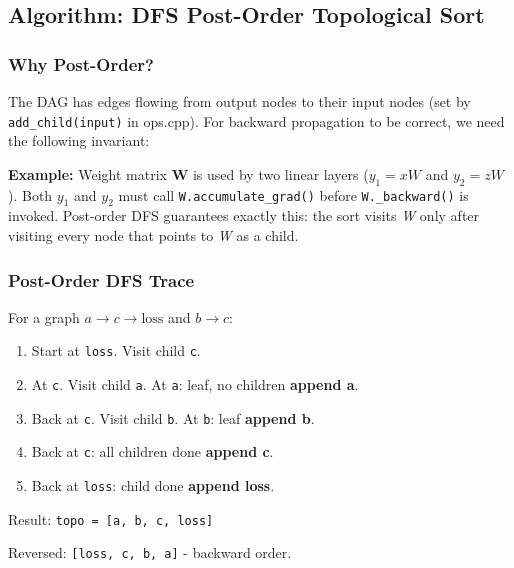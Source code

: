 \documentclass[12pt, a4paper]{article}
\begin{document}
\subsection{Algorithm: DFS Post-Order Topological Sort}

\subsubsection{Why Post-Order?}

The DAG has edges flowing from output nodes to their input nodes (set by
\texttt{add\_child(input)} in ops.cpp).  For backward propagation to be
correct, we need the following invariant:

\begin{tcolorbox}[interviewbox,
    title={Invariant: A node's gradient must be \emph{fully accumulated}
           before its \texttt{\_backward()} fires.}]
  \textbf{Example:}  Weight matrix \textbf{W} is used by two linear layers
  (\(y_1 = xW\) and \(y_2 = zW\)).  Both \(y_1\) and \(y_2\) must call
  \texttt{W.accumulate\_grad()} before \texttt{W.\_backward()} is invoked.
  Post-order DFS guarantees exactly this: the sort visits \textit{W} only
  after visiting every node that points to \textit{W} as a child.
\end{tcolorbox}

\subsubsection{Post-Order DFS Trace}

For a graph \(a \to c \to \text{loss}\) and \(b \to c\):

\begin{enumerate}
  \item Start at \texttt{loss}.  Visit child \texttt{c}.
  \item At \texttt{c}.  Visit child \texttt{a}.  At \texttt{a}: leaf, no
        children  \textbf{append a}.
  \item Back at \texttt{c}.  Visit child \texttt{b}.  At \texttt{b}: leaf
         \textbf{append b}.
  \item Back at \texttt{c}: all children done  \textbf{append c}.
  \item Back at \texttt{loss}: child done  \textbf{append loss}.
\end{enumerate}

Result:  \texttt{topo = [a, b, c, loss]}

Reversed: \texttt{[loss, c, b, a]} - backward order. \checkmark
\end{document}
